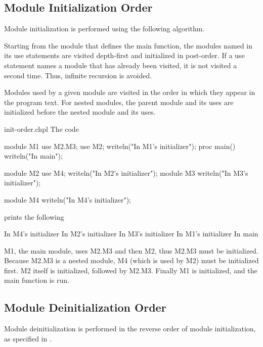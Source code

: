 \subsection{Module Initialization Order}
\label{Module_Initialization_Order}

Module initialization is performed using the following algorithm.

Starting from the module that defines the main function, the modules named in
its use statements are visited depth-first and initialized in post-order.  If a
use statement names a module that has already been visited, it is not visited a
second time.  Thus, infinite recursion is avoided.

Modules used by a given module are visited in the order in which
they appear in the program text.  For nested modules, the
parent module and its uses are initialized before the nested module and its uses.

\begin{chapelexample}{init-order.chpl}
The code
\begin{chapel}
module M1 {
  use M2.M3;
  use M2;
  writeln("In M1's initializer");
  proc main() {
    writeln("In main");
  }
}

module M2 {
  use M4;
  writeln("In M2's initializer");
  module M3 {
    writeln("In M3's initializer");
  }
}

module M4 {
  writeln("In M4's initializer");
}
\end{chapel}
prints the following
\begin{chapelprintoutput}
In M4's initializer
In M2's initializer
In M3's initializer
In M1's initializer
In main
\end{chapelprintoutput}
M1, the main module, uses M2.M3 and then M2, thus M2.M3 must be
initialized.  Because M2.M3 is a nested module, M4 (which is used by
M2) must be initialized first.  M2 itself is initialized, followed by
M2.M3.  Finally M1 is initialized, and the main function is run.
\end{chapelexample}


\subsection{Module Deinitialization Order}
\label{Module_Deinitialization_Order}

Module deinitialization is performed in the reverse order of
module initialization, as specified in
.

